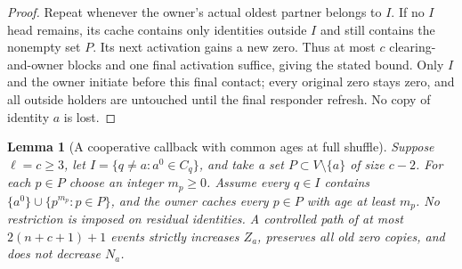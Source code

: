 \documentclass[11pt]{article}
\newtheorem{lemma}[theorem]{Lemma}
\begin{document}
\begin{proof}
Repeat whenever the owner's actual oldest partner
belongs to $I$. If no $I$ head remains, its cache contains
only identities outside $I$ and still contains the
nonempty set $P$. Its next activation gains a new zero.
Thus at most $c$ clearing-and-owner blocks and one
final activation suffice, giving the stated bound.
Only $I$ and the owner initiate before this final
contact; every original zero stays zero, and all
outside holders are untouched until the final
responder refresh. No copy of identity $a$ is lost.
\end{proof}

\begin{lemma}[A cooperative callback with common ages at full shuffle]
\label{lem:fullpositivecallback}
Suppose $\ell=c\ge3$, let
$I=\{q\ne a:a^0\in C_q\}$, and take a set
$P\subset V\setminus\{a\}$ of size $c-2$.
For each $p\in P$ choose an integer $m_p\ge0$.
Assume every $q\in I$ contains
$\{a^0\}\cup\{p^{m_p}:p\in P\}$, and the owner
caches every $p\in P$ with age at least $m_p$.
No restriction is imposed on residual identities.
A controlled path of at most $2(n+c+1)+1$ events
strictly increases $Z_a$, preserves all old zero
copies, and does not decrease $N_a$.
\end{lemma}
\end{document}
